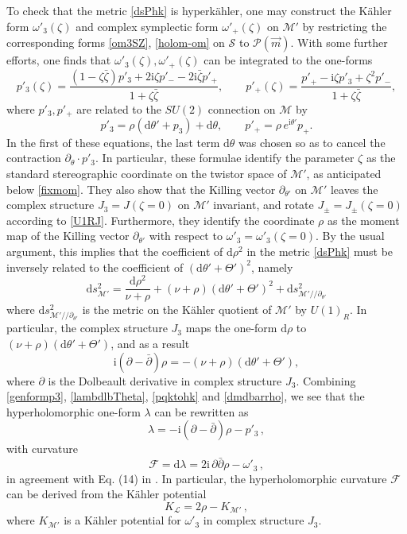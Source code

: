 \documentclass[12pt,reqno]{article}
\numberwithin{equation}{section}
\newcommand{\be}{\begin{equation}}
\newcommand{\ee}{\end{equation}}
\def\({\left(}
\def\){\right)}
\newcommand{\de}{\mathrm{d}}
\newcommand{\I}{\mathrm{i}}
\newcommand{\cS}{\mathcal{S}}
\newcommand{\cM}{\mathcal{M}}
\newcommand{\cP}{\mathcal{P}}
\newcommand{\fb}{\mathscr{F}}
\newcommand{\lb}{\mathscr{L}}
\def\pa{\partial}
\newcommand{\kahler}{{K\"ahler}\xspace}
\newcommand{\hk}{{hyperk\"ahler}\xspace}
\def\varpihk{\zeta}
\def\sigp{{\theta}}
\def\phip{{\theta'}}
\def\kcon{p'_3}
\def\hcon{p'_+}
\def\ahcon{p'_-}
\def\pTheta{\Theta'}
\def\pcM{\cM'}
\def\pomega{\omega'}
\def\cfff{\nu} %
\def\Kc{K} %
\def\conhyper{\lambda}
\numberwithin{equation}{section}
\begin{document}
To check that the metric \eqref{dsPhk} is \hk, one may construct the
\kahler form $\pomega_3(\varpihk)$ and complex symplectic form
$\pomega_+(\varpihk)$ on  $\pcM$ by restricting the corresponding forms
\eqref{om3SZ}, \eqref{holom-om} on $\cS$ to $\cP(\vec m)$. With some further efforts, one finds that
$\pomega_3(\varpihk),\pomega_+(\varpihk)$ can be integrated
to the one-forms
\be
\kcon(\varpihk)=
\frac{(1-\varpihk\bar\varpihk) \kcon+2\I\varpihk\ahcon-2\I\bar\varpihk\hcon}{1+\varpihk\bar\varpihk} ,
\qquad
\hcon(\varpihk)=
\frac{\hcon-\I\varpihk\kcon+\varpihk^2\ahcon}{1+\varpihk\bar\varpihk} ,
\label{rot-con}
\ee
where $\kcon,\hcon$ are related to the $SU(2)$ connection on $\cM$ by
\be
\label{pqktohk}
\kcon=\rho \left( \de\phip+p_3\right) +\de\theta ,
\qquad
\hcon=\rho\, e^{\I\phip} p_+ .
\ee
In the first of these equations, the last term $\de\theta$ was chosen so as to cancel
the contraction $\pa_{\sigp}\cdot \kcon$.
In particular, these formulae identify the parameter $\varpihk$ as the standard stereographic
coordinate on the twistor space of $\pcM$, as anticipated below \eqref{fixmom}.
They also show that the Killing vector $\pa_\phip$ on $\pcM$ leaves the
complex structure $J_3=J(\varpihk=0)$ on $\pcM$ invariant, and rotate
$J_\pm=J_\pm(\varpihk=0)$ according to \eqref{U1RJ}. Furthermore, they identify the
coordinate $\rho$ as the moment map of the Killing vector $\pa_\phip$
with respect to $\pomega_3=\pomega_3(\varpihk=0)$. By the usual argument, this implies
that the coefficient of $\de\rho^2$ in the metric \eqref{dsPhk} must be inversely related to the
coefficient of $(\de\phip+\pTheta)^2$, namely
\be
\label{hkgenrho}
\de s^2_{\pcM} =\frac{\de\rho^2}{\cfff+\rho}+(\cfff+\rho) \(\de\phip+\pTheta\)^2 +\de s^2_{\pcM//\pa_\phip}
\ee
where $\de s^2_{\pcM//\pa_\phip}$ is the metric on the \kahler quotient of $\pcM$ by
$U(1)_R$.  In particular, the complex structure $J_3$ maps the one-form $\de\rho$
to $(\cfff+\rho)\( \de\phip+\pTheta\)$, and as a result
\be
\label{dmdbarrho}
\I (\pa-\bar\pa)\rho = -(\cfff+\rho)  \( \de\phip+\pTheta\) ,
\ee
where $\pa$ is the Dolbeault derivative in complex structure $J_3$.
Combining \eqref{genformp3}, \eqref{lambdlbTheta}, \eqref{pqktohk}  and \eqref{dmdbarrho},
we see that the hyperholomorphic one-form $\conhyper$ can be rewritten as
\be
\label{contohyp}
\conhyper = -\I (\pa-\bar\pa)\rho - \kcon\, ,
\ee
with curvature
\be
\label{FLgen}
\fb = \de \conhyper  = 2\I \, \pa\bar\pa \rho - \pomega_3 \, ,
\ee
in agreement with Eq. (14) in \cite{1143.53043}. In particular,
the hyperholomorphic curvature $\fb$ can be derived from the \kahler potential
\be
\label{KltoKc}
K_{\lb} = 2\rho - \Kc_{\pcM}\, ,
\ee
where $ \Kc_{\pcM}$ is a \kahler potential for $\pomega_3$ in complex structure $J_3$.
\end{document}
